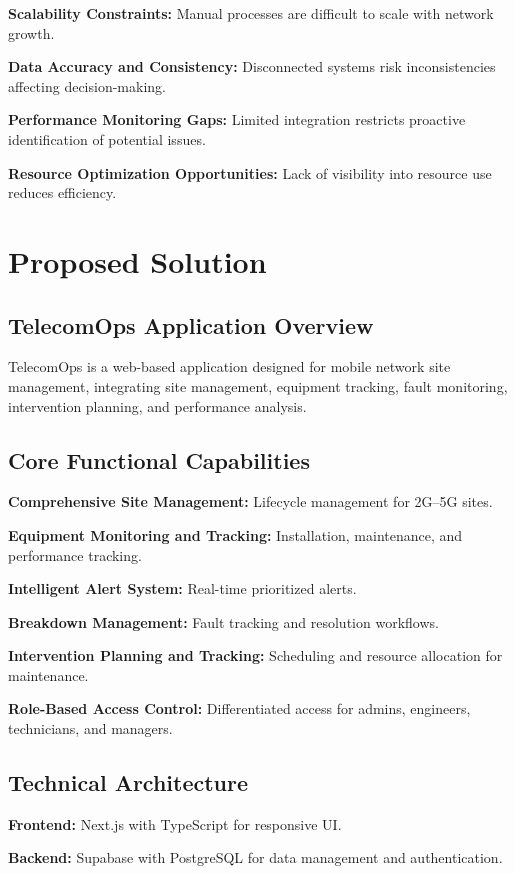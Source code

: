 \textbf{Scalability Constraints:} Manual processes are difficult to scale with network growth.

\textbf{Data Accuracy and Consistency:} Disconnected systems risk inconsistencies affecting decision-making.

\textbf{Performance Monitoring Gaps:} Limited integration restricts proactive identification of potential issues.

\textbf{Resource Optimization Opportunities:} Lack of visibility into resource use reduces efficiency.

\section{Proposed Solution}

\subsection{TelecomOps Application Overview}
TelecomOps is a web-based application designed for mobile network site management, integrating site management, equipment tracking, fault monitoring, intervention planning, and performance analysis.

\subsection{Core Functional Capabilities}
\textbf{Comprehensive Site Management:} Lifecycle management for 2G–5G sites.  

\textbf{Equipment Monitoring and Tracking:} Installation, maintenance, and performance tracking.  

\textbf{Intelligent Alert System:} Real-time prioritized alerts.  

\textbf{Breakdown Management:} Fault tracking and resolution workflows.  

\textbf{Intervention Planning and Tracking:} Scheduling and resource allocation for maintenance.  

\textbf{Role-Based Access Control:} Differentiated access for admins, engineers, technicians, and managers.

\subsection{Technical Architecture}
\textbf{Frontend:} Next.js with TypeScript for responsive UI.  

\textbf{Backend:} Supabase with PostgreSQL for data management and authentication.  

